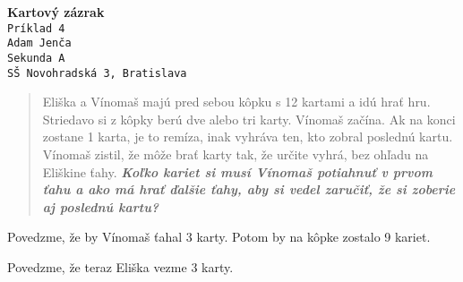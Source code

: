 \documentclass{article}
\begin{document}
\begin{center}
	\huge \textbf{Kartový zázrak}\\
	\large \texttt{Príklad 4}\\
	\large \texttt{Adam Jenča}\\
	\large \texttt{Sekunda A}\\
	\large \texttt{SŠ Novohradská 3, Bratislava}\\
\end{center}
\vskip 1cm
\begin{quote}
Eliška a Vínomaš majú pred sebou kôpku s 12 kartami a idú hrať hru. Striedavo si z kôpky berú dve alebo tri karty. Vínomaš začína. Ak na konci zostane 1 karta, je to remíza, inak vyhráva ten, kto zobral poslednú kartu. Vínomaš zistil, že môže brať karty tak, že určite vyhrá, bez ohľadu na Eliškine ťahy.
	\textit{\textbf{Koľko kariet si musí Vínomaš potiahnuť v prvom ťahu a ako má hrať ďalšie ťahy, aby si vedel zaručiť, že si zoberie aj poslednú kartu?}}
\end{quote}
Povedzme, že by Vínomaš ťahal 3 karty.
Potom by na kôpke zostalo 9 kariet.
\begin{center}
\end{center}
Povedzme, že teraz Eliška vezme 3 karty.
\end{document}
